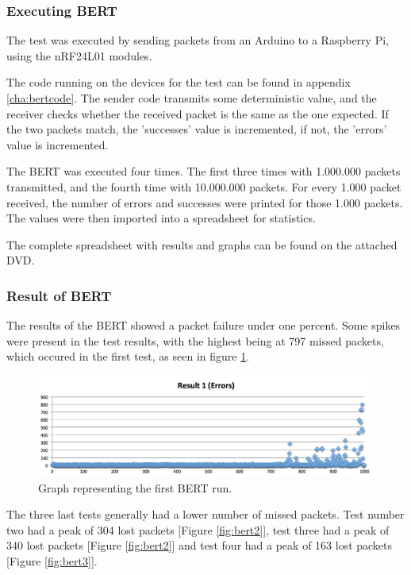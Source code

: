 \subsubsection*{Executing BERT} 
The test was executed by sending packets from an Arduino to a Raspberry Pi, using the nRF24L01 modules.

The code running on the devices for the test can be found in appendix \ref{cha:bertcode}.
The sender code transmits some deterministic value, and the receiver checks whether the received packet is the same as the one expected. If the two packets match, the 'successes' value is incremented, if not, the 'errors' value is incremented.

The BERT was executed four times. The first three times with 1.000.000 packets transmitted, and the fourth time with 10.000.000 packets. For every 1.000 packet received, the number of errors and successes were printed for those 1.000 packets. 
The values were then imported into a spreadsheet for statistics.

The complete spreadsheet with results and graphs can be found on the attached DVD. 

\subsubsection*{Result of BERT}
The results of the BERT showed a packet failure under one percent. Some spikes were present in the test results, with the highest being at 797 missed packets, which occured in the first test, as seen in figure \ref{fig:bert1}.

\begin{figure}[h!]
\hspace*{-2cm}
\includegraphics[width=1.3\textwidth]{chapters/test/figures/res1.png}
\caption{Graph representing the first BERT run.}
\label{fig:bert1}
\end{figure}

The three last tests generally had a lower number of missed packets. Test number two had a peak of 304 lost packets [Figure \ref{fig:bert2}], test three had a peak of 340 lost packets [Figure \ref{fig:bert2}] and test four had a peak of 163 lost packets [Figure \ref{fig:bert3}].

